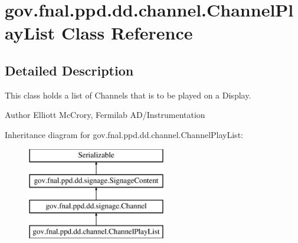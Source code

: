 \hypertarget{classgov_1_1fnal_1_1ppd_1_1dd_1_1channel_1_1ChannelPlayList}{\section{gov.\-fnal.\-ppd.\-dd.\-channel.\-Channel\-Play\-List Class Reference}
\label{classgov_1_1fnal_1_1ppd_1_1dd_1_1channel_1_1ChannelPlayList}
}


\subsection{Detailed Description}
This class holds a list of Channels that is to be played on a Display.

\begin{DoxyAuthor}{Author}
Elliott Mc\-Crory, Fermilab A\-D/\-Instrumentation 
\end{DoxyAuthor}
Inheritance diagram for gov.\-fnal.\-ppd.\-dd.\-channel.\-Channel\-Play\-List\-:\begin{figure}[H]
\begin{center}
\leavevmode
\includegraphics[height=4.000000cm]{classgov_1_1fnal_1_1ppd_1_1dd_1_1channel_1_1ChannelPlayList}
\end{center}
\end{figure}

